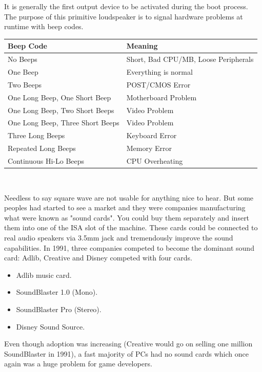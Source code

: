 \documentclass[book.tex]{subfiles}
\begin{document}
\par
 It is generally the first output device to be activated during the boot process. The purpose of this primitive loudspeaker is to signal hardware problems at runtime with beep codes.\\
\par
\begin{tabularx}{\textwidth}{l l}
\textbf{Beep Code} & \textbf{Meaning}  \\ \hline
No Beeps                         & Short, Bad CPU/MB, Loose Peripherals \\ \hline
One Beep                         & Everything is normal\\ \hline
Two Beeps                        & POST/CMOS Error \\ \hline 
One Long Beep, One Short Beep    & Motherboard Problem \\ \hline
One Long Beep, Two Short Beeps   & Video Problem \\ \hline
One Long Beep, Three Short Beeps & Video Problem \\ \hline
Three Long Beeps                 & Keyboard Error \\ \hline
Repeated Long Beeps              & Memory Error \\ \hline
Continuous Hi-Lo Beeps           & CPU Overheating \\ \hline
\end{tabularx}\\
\bigskip
\par
Needless to say square wave are not usable for anything nice to hear. But some peoples had started to see a market and they were companies manufacturing what were known as "sound cards". You could buy them separately and insert them into one of the ISA slot of the machine. These cards could be connected to real audio speakers via 3.5mm jack and tremendously improve the sound capabilities. In 1991, three companies competed to become the dominant sound card: Adlib, Creative and Disney competed with four cards.\\
\par
\begin{itemize}
\item Adlib music card.
\item SoundBlaster 1.0 (Mono).
\item SoundBlaster Pro (Stereo).
\item Disney Sound Source.
\end{itemize}
\par
Even though adoption was increasing (Creative would go on selling one million SoundBlaster in 1991), a fast majority of PCs had no sound cards which once again was a huge problem for game developers.
\end{document}

